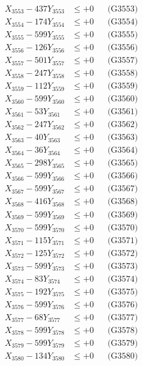 \documentclass[a4paper,10pt]{article}
\begin{document}
{\begin{align}
X_{3553} - 437Y_{3553} &\leq +0 && \text{(G3553)} \\
X_{3554} - 174Y_{3554} &\leq +0 && \text{(G3554)} \\
X_{3555} - 599Y_{3555} &\leq +0 && \text{(G3555)} \\
X_{3556} - 126Y_{3556} &\leq +0 && \text{(G3556)} \\
X_{3557} - 501Y_{3557} &\leq +0 && \text{(G3557)} \\
X_{3558} - 247Y_{3558} &\leq +0 && \text{(G3558)} \\
X_{3559} - 112Y_{3559} &\leq +0 && \text{(G3559)} \\
X_{3560} - 599Y_{3560} &\leq +0 && \text{(G3560)} \\
\allowbreak
X_{3561} - 53Y_{3561} &\leq +0 && \text{(G3561)} \\
X_{3562} - 247Y_{3562} &\leq +0 && \text{(G3562)} \\
X_{3563} - 40Y_{3563} &\leq +0 && \text{(G3563)} \\
X_{3564} - 36Y_{3564} &\leq +0 && \text{(G3564)} \\
X_{3565} - 298Y_{3565} &\leq +0 && \text{(G3565)} \\
X_{3566} - 599Y_{3566} &\leq +0 && \text{(G3566)} \\
X_{3567} - 599Y_{3567} &\leq +0 && \text{(G3567)} \\
X_{3568} - 416Y_{3568} &\leq +0 && \text{(G3568)} \\
X_{3569} - 599Y_{3569} &\leq +0 && \text{(G3569)} \\
X_{3570} - 599Y_{3570} &\leq +0 && \text{(G3570)} \\
\allowbreak
X_{3571} - 115Y_{3571} &\leq +0 && \text{(G3571)} \\
X_{3572} - 125Y_{3572} &\leq +0 && \text{(G3572)} \\
X_{3573} - 599Y_{3573} &\leq +0 && \text{(G3573)} \\
X_{3574} - 83Y_{3574} &\leq +0 && \text{(G3574)} \\
X_{3575} - 192Y_{3575} &\leq +0 && \text{(G3575)} \\
X_{3576} - 599Y_{3576} &\leq +0 && \text{(G3576)} \\
X_{3577} - 68Y_{3577} &\leq +0 && \text{(G3577)} \\
X_{3578} - 599Y_{3578} &\leq +0 && \text{(G3578)} \\
X_{3579} - 599Y_{3579} &\leq +0 && \text{(G3579)} \\
X_{3580} - 134Y_{3580} &\leq +0 && \text{(G3580)} \\

\end{align}}
\end{document}
